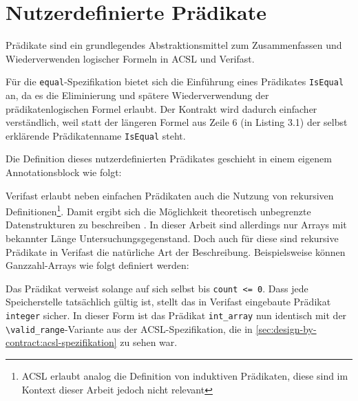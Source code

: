\section{Nutzerdefinierte Prädikate}
\label{sec:design-by-contract:predicates}

Prädikate sind ein grundlegendes Abstraktionsmittel zum Zusammenfassen und Wiederverwenden logischer
Formeln in ACSL und Verifast.

Für die \texttt{equal}-Spezifikation bietet sich die Einführung eines Prädikates \texttt{IsEqual} an,
da es die Eliminierung und spätere Wiederverwendung der prädikatenlogischen Formel erlaubt. Der Kontrakt
wird dadurch einfacher verständlich, weil statt der längeren Formel aus Zeile 6 (in Listing 3.1) der selbst erklärende
Prädikatenname \texttt{IsEqual} steht.



Die Definition dieses nutzerdefinierten Prädikates geschieht in einem eigenem Annotationsblock wie folgt:



Verifast erlaubt neben einfachen Prädikaten auch die Nutzung von rekursiven Definitionen\footnote{ACSL erlaubt
analog die Definition von induktiven Prädikaten, diese sind im Kontext dieser Arbeit jedoch nicht relevant}. 
Damit ergibt sich die Möglichkeit theoretisch unbegrenzte Datenstrukturen zu beschreiben \cite[S. 9]{jacobs-tutorial}. In dieser
Arbeit sind allerdings nur Arrays mit bekannter Länge Untersuchungsgegenstand. Doch auch für diese sind
rekursive Prädikate in Verifast die natürliche Art der Beschreibung. Beispielsweise können Ganzzahl-Arrays
wie folgt definiert werden:



Das Prädikat verweist solange auf sich selbst bis \lstinline{count <= 0}. Dass jede Speicherstelle tatsächlich
gültig ist, stellt das in Verifast eingebaute Prädikat \lstinline{integer} sicher. In dieser Form ist das Prädikat
\lstinline{int_array} nun identisch mit der \lstinline{\valid_range}-Variante aus der ACSL-Spezifikation, 
die in \ref{sec:design-by-contract:acsl-spezifikation} zu sehen war.

